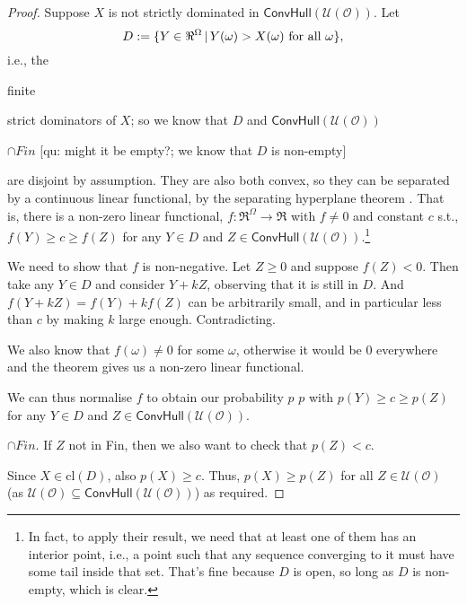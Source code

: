 \documentclass[a4paper]{article}
\newcommand\cl{\mathrm{cl}}
\renewcommand\O{\mathcal{O}}
\newcommand\Uwald{\mathcal{U}} %
\newcommand{\Conv}{\mathsf{ConvHull}}
\newcommand\SetDelimiter[1][]{
	\nonscript\,#1\vert \allowbreak \nonscript\,\mathopen{}}
\providecommand\given{\SetDelimiter}
\renewcommand{\geq}{\geqslant}
\newenvironment{CCM rewritten}
{\begingroup\color{blue}} %
{\endgroup}              %
\begin{document}
	\begin{proof}
		Suppose $X$ is not strictly dominated in $\Conv(\Uwald(\O))$. 
		Let $$D:=\{Y\in \Re^\Omega\given Y(\omega)>X(\omega)\text{ for all $\omega$}\},$$ i.e., the \begin{infversion}
			finite
		\end{infversion} strict dominators of $X$; so we know that $D$ and $\Conv(\Uwald(\O))$ \begin{infversion}
			$\cap Fin$ [qu: might it be empty?; we know that $D$ is non-empty]
		\end{infversion}are disjoint by assumption. They are also both convex, so they can be separated by a continuous linear functional, by the separating hyperplane theorem \citep[Theorem 5.61]{aliprantis2006infinite}. %
		That is, there is a non-zero linear functional, $f:\Re^\Omega\to\Re$ with $f\neq 0$ and constant $c$ s.t.,  $f(Y)\geq c \geq f(Z)$ for any $Y\in D$ and $Z\in \Conv(\Uwald(\O))$.\footnote{In fact, to apply their result, we need that at least one of them has an interior point, i.e., a point such that any sequence converging to it must have some tail inside that set. That's fine because $D$ is open, so long as $D$ is non-empty, which is clear.
	}
		
		We need to show that $f$ is non-negative. Let $Z\geq 0$ and suppose $f(Z)<0$. Then take any $Y\in D$ and consider $Y+kZ$, observing that it is still in $D$. And $f(Y+kZ)=f(Y)+kf(Z)$ can be arbitrarily small, and in particular less than $c$ by making $k$ large enough. Contradicting. 
		
		We also know that $f(\omega)\neq 0$ for some $\omega$, otherwise it would be $0$ everywhere and the theorem gives us a non-zero linear functional. 
		
		
		We can thus normalise $f$ to obtain our probability $p$ $p$ with $p(Y)\geq c \geq p(Z)$ for any $Y\in D$ and $Z\in \Conv(\Uwald(\O))$.\begin{infversion}
			$\cap Fin$. If $Z$ not in Fin, then we also want to check that $p(Z)<c$. 
		\end{infversion}
		
		Since $X\in\cl(D)$, also $p(X)\geq c$. Thus, $p(X)\geq p(Z)$ for all $Z\in \Uwald(\O)$ (as $\Uwald(\O)\subseteq \Conv(\Uwald(\O))$) as required.
	\end{proof}
	
\end{document}
